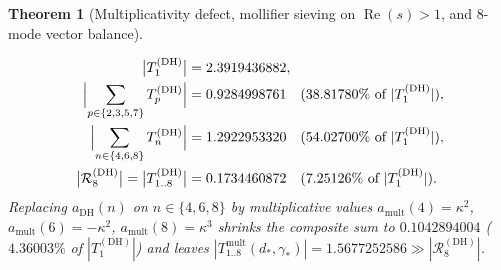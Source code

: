 \documentclass[11pt,reqno]{amsart}
\newtheorem{theorem}{Theorem}[section]
\theoremstyle{definition}
\theoremstyle{remark}
\numberwithin{equation}{section}
\DeclareMathOperator{\Reop}{Re}
\begin{document}
\begin{theorem}[Multiplicativity defect, mollifier sieving on $\Reop(s)>1$, and 8-mode vector balance]
\begin{enumerate}[label=\textup{(\roman*)},leftmargin=2.2em]
  \begin{align}
    \bigl|T_1^{(\mathrm{DH})}\bigr| &= 2.3919436882, \nonumber\\
    \Bigl|\sum_{p \in \{2,3,5,7\}} T_p^{(\mathrm{DH})}\Bigr| &= 0.9284998761 \quad (38.81780\%\text{ of }|T_1^{(\mathrm{DH})}|), \nonumber\\
    \Bigl|\sum_{n \in \{4,6,8\}} T_n^{(\mathrm{DH})}\Bigr| &= 1.2922953320 \quad (54.02700\%\text{ of }|T_1^{(\mathrm{DH})}|), \nonumber\\
    \bigl|\mathcal{R}_8^{(\mathrm{DH})}\bigr| = \bigl|T_{1..8}^{(\mathrm{DH})}\bigr| &= 0.1734460872 \quad (7.25126\%\text{ of }|T_1^{(\mathrm{DH})}|).
    \label{eq:mode-cancellation-anatomy}
  \end{align}
  Replacing $a_{\mathrm{DH}}(n)$ on $n\in\{4,6,8\}$ by multiplicative values $a_{\mathrm{mult}}(4)=\kappa^2$, $a_{\mathrm{mult}}(6)=-\kappa^2$, $a_{\mathrm{mult}}(8)=\kappa^3$ shrinks the composite sum to $0.1042894004$ ($4.36003\%$ of $|T_1^{(\mathrm{DH})}|$) and leaves $|T_{1..8}^{\mathrm{mult}}(d_*,\gamma_*)| = 1.5677252586 \gg |\mathcal{R}_8^{(\mathrm{DH})}|$.
\end{enumerate}
\end{theorem}
\end{document}
